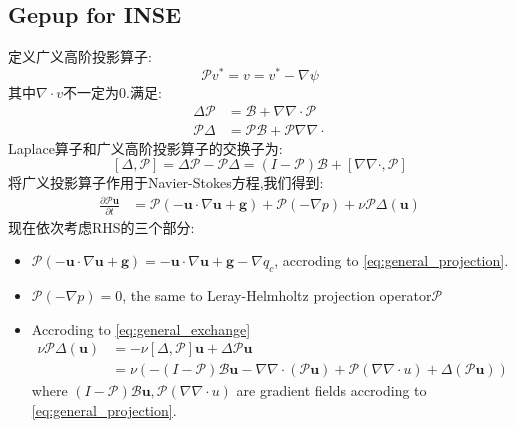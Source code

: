 \documentclass[12pt,halfline,a4paper]{ouparticle}
\begin{document}
\subsection{Gepup for INSE}
定义广义高阶投影算子:
\begin{equation}\label{eq:general_projection}
    \mathcal{P}v^* = v = v^* - \nabla \psi 
\end{equation}
其中$\nabla\cdot v$不一定为0.满足:
\begin{equation}\label{eq:laplacian_general_projection}
    \begin{aligned}
        \Delta \mathcal{P} &= \mathcal{B}+ \nabla\nabla\cdot \mathcal{P}\\
        \mathcal{P}\Delta &= \mathcal{P}\mathcal{B}+ \mathcal{P}\nabla\nabla\cdot
    \end{aligned}
\end{equation}
Laplace算子和广义高阶投影算子的交换子为:
\begin{equation}\label{eq:general_exchange}
    [\Delta, \mathcal{P}] = \Delta \mathcal{P} - \mathcal{P}\Delta = (I - \mathcal{P})\mathcal{B} + [\nabla\nabla\cdot,\mathcal{P}]
\end{equation}
将广义投影算子作用于Navier-Stokes方程,我们得到:
\begin{equation}\label{eq:general_projection_ns}
    \begin{aligned}
        \frac{\partial \mathcal{P}\boldsymbol{u} }{\partial t}&= \mathcal{P}(-\boldsymbol{u} \cdot \nabla \boldsymbol{u}  + \mathbf{g}) +\mathcal{P}(-\nabla p) + \nu \mathcal{P}\Delta (\boldsymbol{u})
    \end{aligned}
\end{equation}
现在依次考虑RHS的三个部分:
\begin{itemize}
    \item $\mathcal{P}(-\boldsymbol{u} \cdot \nabla \boldsymbol{u}  + \mathbf{g}) = -\boldsymbol{u} \cdot \nabla \boldsymbol{u}  + \mathbf{g} - \nabla q_c$, accroding to \eqref{eq:general_projection}.
    \item $\mathcal{P}(-\nabla p) = 0$, the same to Leray-Helmholtz projection operator$\mathscr{P}$
    \item Accroding to \eqref{eq:general_exchange}
    \begin{equation}
        \begin{aligned}
            \nu \mathcal{P}\Delta (\boldsymbol{u}) &= -\nu[\Delta,\mathcal{P}]\boldsymbol{u} + \Delta
            \mathcal{P}\boldsymbol{u} \\
            &= \nu(-(I-\mathcal{P})\mathcal{B}\boldsymbol{u}-\nabla\nabla\cdot(\mathcal{P}\boldsymbol{u})+\mathcal{P}(\nabla\nabla \cdot u)+\Delta(\mathcal{P}\boldsymbol{u}))
        \end{aligned}
    \end{equation}
    where $(I-\mathcal{P})\mathcal{B}\boldsymbol{u},\mathcal{P}(\nabla\nabla \cdot u)$ are gradient fields accroding to \eqref{eq:general_projection}.
\end{itemize}
\end{document}
